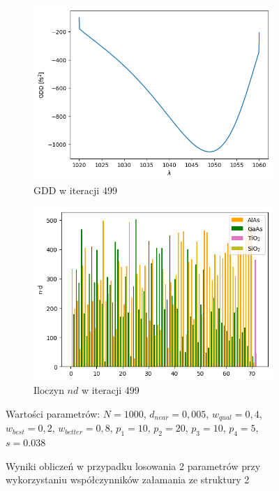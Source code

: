 \begin{figure} [H]
\begin{subfigure}[b]{0.31\textwidth}
        \includegraphics[width=\linewidth]{figures/wyniki/2stopien/result_gddresult499.png}
        \caption{GDD w iteracji 499}
    \end{subfigure}
        \begin{subfigure}[b]{0.32\textwidth}
        \includegraphics[width=\linewidth]{figures/wyniki/2stopien/result_ndresult499.png}
        \caption{Iloczyn $nd$ w iteracji 499}
    \end{subfigure}
    \caption{Wyniki obliczeń w przypadku losowania 2 parametrów przy wykorzystaniu współczynników załamania ze struktury 2}
    Wartości parametrów: $N= 1000$, $d_{near}= 0,005$, $w_{qual}=0,4$, $w_{best}=0,2$, $w_{better}=0,8$, $p_1=10$, $p_2=20$, $p_3=10$, $p_4=5$, $s=0.038$
    \label{fig:wyn2stp2}
\end{figure}

